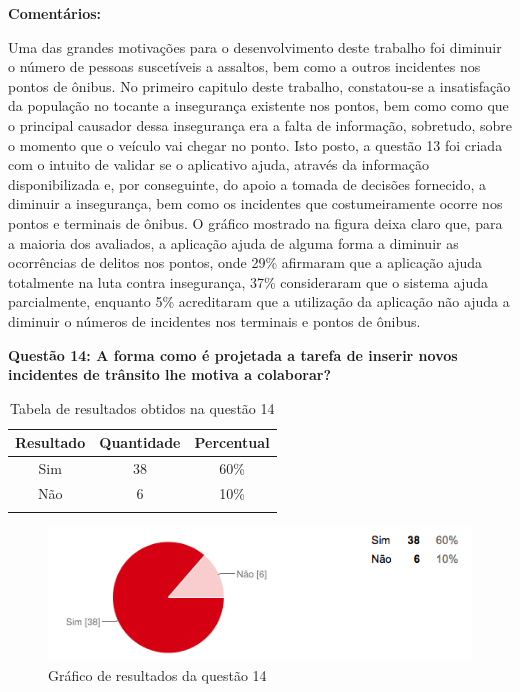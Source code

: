 \textbf{Comentários:}

Uma das grandes motivações para o desenvolvimento deste trabalho foi diminuir o número de pessoas suscetíveis a assaltos, bem como a outros incidentes nos pontos de ônibus. No primeiro capitulo deste trabalho, constatou-se a insatisfação da população no tocante a insegurança existente nos pontos, bem como como que o principal causador dessa insegurança era a falta de informação, sobretudo, sobre o momento que o veículo vai chegar no ponto. 
Isto posto, a questão 13 foi criada com o intuito de validar se o aplicativo ajuda, através da informação disponibilizada e, por conseguinte, do apoio a tomada de decisões fornecido, a diminuir a insegurança, bem como os incidentes que costumeiramente ocorre nos pontos e terminais de ônibus.
O gráfico mostrado na figura  deixa claro que, para a maioria dos avaliados, a aplicação ajuda de alguma forma a diminuir as ocorrências de delitos nos pontos, onde 29\% afirmaram que a aplicação ajuda totalmente na luta contra insegurança, 37\% consideraram que o sistema ajuda parcialmente, enquanto 5\% acreditaram que a utilização da aplicação não ajuda a diminuir o números de incidentes nos terminais e pontos de ônibus.\newline


\textbf{Questão 14: A forma como é projetada a tarefa de inserir novos incidentes de trânsito lhe motiva a colaborar?}

\begin{center}
\begin{longtable}{c|c|c}
\hline
    \multicolumn{1}{c}{\textbf{Resultado}} & \multicolumn{1}{c}{\textbf{Quantidade}} & \multicolumn{1}{c}{\textbf{Percentual}} \\
\hline
    Sim & 38 &  60\%\\
    \hline
    Não & 6 & 10\%\\
    \hline
\caption{Tabela de resultados obtidos na questão 14}
\label{tabq14}
\end{longtable}
\end{center}


\begin{figure}[h]
\begin{center}
  \includegraphics[width=16cm]{images/graficos/questao14.png}
  \caption{Gráfico de resultados da questão 14}
  \label{fig:questao14}
\end{center}
\end{figure}


